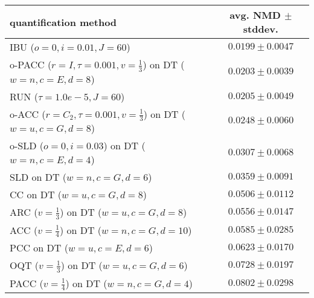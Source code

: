 \begin{tabular}{lc}
  \toprule
  quantification method & avg. NMD $\pm$ stddev. \\
  \midrule
  IBU ($o=0, i=0.01, J=60$) & $\mathbf{0.0199 \pm 0.0047}$ \\
  o-PACC ($r=I, \tau=0.001, v=\frac{1}{3}$) on DT ($w=n, c=E, d=8$) & $0.0203 \pm 0.0039$ \\
  RUN ($\tau=1.0e-5, J=60$) & $0.0205 \pm 0.0049$ \\
  o-ACC ($r=C_2, \tau=0.001, v=\frac{1}{3}$) on DT ($w=u, c=G, d=8$) & $0.0248 \pm 0.0060$ \\
  o-SLD ($o=0, i=0.03$) on DT ($w=n, c=E, d=4$) & $0.0307 \pm 0.0068$ \\
  SLD on DT ($w=n, c=G, d=6$) & $0.0359 \pm 0.0091$ \\
  CC on DT ($w=u, c=G, d=8$) & $0.0506 \pm 0.0112$ \\
  ARC ($v=\frac{1}{3}$) on DT ($w=u, c=G, d=8$) & $0.0556 \pm 0.0147$ \\
  ACC ($v=\frac{1}{4}$) on DT ($w=n, c=G, d=10$) & $0.0585 \pm 0.0285$ \\
  PCC on DT ($w=u, c=E, d=6$) & $0.0623 \pm 0.0170$ \\
  OQT ($v=\frac{1}{3}$) on DT ($w=u, c=G, d=6$) & $0.0728 \pm 0.0197$ \\
  PACC ($v=\frac{1}{4}$) on DT ($w=n, c=G, d=4$) & $0.0802 \pm 0.0298$ \\
  \bottomrule
\end{tabular}
